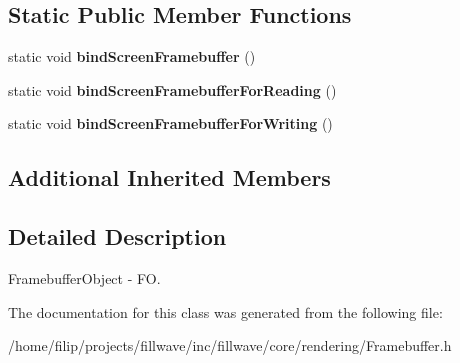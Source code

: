 \subsection*{Static Public Member Functions}
\begin{DoxyCompactItemize}
\item 
\mbox{\label{classflw_1_1flc_1_1Framebuffer_ab0dab25735dc8694de3c4c05cf0cfedf}} 
static void {\bfseries bind\+Screen\+Framebuffer} ()
\item 
\mbox{\label{classflw_1_1flc_1_1Framebuffer_a4f51156591b3b95480621cf3eb424328}} 
static void {\bfseries bind\+Screen\+Framebuffer\+For\+Reading} ()
\item 
\mbox{\label{classflw_1_1flc_1_1Framebuffer_a0e99d4cc1d24e9ae016695ddc524bdd3}} 
static void {\bfseries bind\+Screen\+Framebuffer\+For\+Writing} ()
\end{DoxyCompactItemize}
\subsection*{Additional Inherited Members}


\subsection{Detailed Description}
Framebuffer\+Object -\/ FO. 

The documentation for this class was generated from the following file\+:\begin{DoxyCompactItemize}
\item 
/home/filip/projects/fillwave/inc/fillwave/core/rendering/Framebuffer.\+h\end{DoxyCompactItemize}
